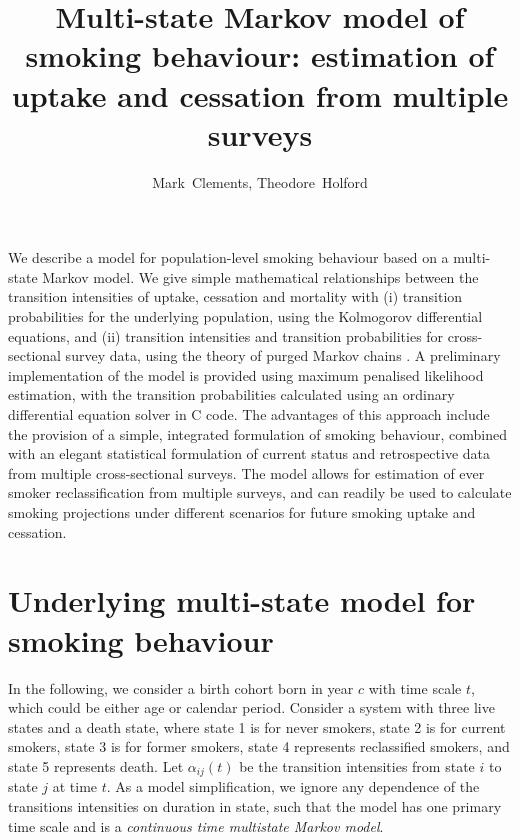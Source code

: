 \documentclass[11pt,a4paper]{article}
\title{Multi-state Markov model of smoking behaviour: estimation of
  uptake and cessation from multiple surveys}
\author{Mark~Clements, Theodore~Holford}
\begin{document}
\maketitle

\abstract We describe a model for population-level smoking behaviour
based on a multi-state Markov model. We give simple mathematical
relationships between the transition intensities of uptake, cessation
and mortality with (i) transition probabilities for the underlying
population, using the Kolmogorov differential equations, and (ii)
transition intensities and transition probabilities for
cross-sectional survey data, using the theory of purged Markov chains
\citep{hoem_purged_1969}. A preliminary implementation of the model
is provided using maximum penalised likelihood estimation, with the
transition probabilities calculated using an ordinary differential
equation solver in C code. The advantages of this approach include the
provision of a simple, integrated formulation of smoking behaviour,
combined with an elegant statistical formulation of current status and
retrospective data from multiple cross-sectional surveys. The model
allows for estimation of ever smoker reclassification from multiple
surveys, and can readily be used to calculate smoking projections
under different scenarios for future smoking uptake and cessation. 

\section{Underlying multi-state model for smoking behaviour}

In the following, we consider a birth cohort born in year $c$ with
time scale $t$, which could be either age or calendar period.
Consider a system with three live states and a death state, where
state 1 is for never smokers, state 2 is for current smokers, state 3
is for former smokers, state 4 represents reclassified smokers, and state 5 represents death. Let
$\alpha_{ij}(t)$ be the transition intensities from state $i$ to state
$j$ at time $t$. As a model simplification, we ignore any dependence
of the transitions intensities on duration in state, such that the
model has one primary time scale and is a \emph{continuous time multistate Markov
  model}.
\end{document}
